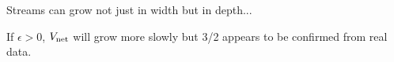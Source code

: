     Streams can grow not just in width but in depth...
  
    If $\epsilon > 0$, $V_{\textnormal{net}}$ will grow more slowly
    but 3/2 appears to be confirmed from real data.
  


